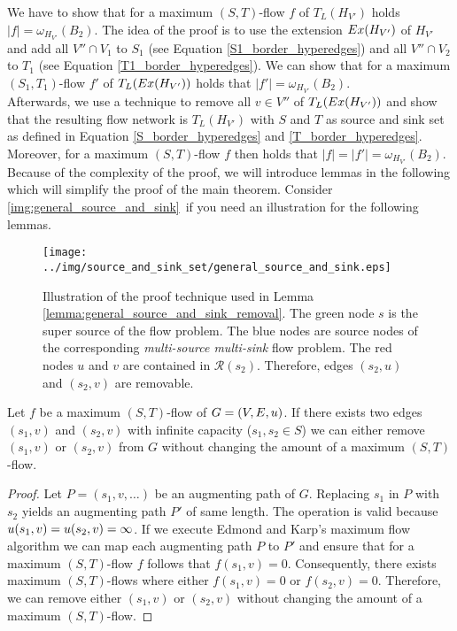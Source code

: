 We have to show that for a maximum $(S,T)$-flow $f$ of $T_L(H_{V'})$ holds $|f| = \omega_{H_{V'}}(B_2)$.
The idea of the proof is to use the extension $Ex(H_{V'})$ of $H_{V'}$ and add 
all $V'' \cap V_1$ to $S_1$ (see Equation \ref{S1_border_hyperedges}) and all $V'' \cap V_2$ to
$T_1$ (see Equation \ref{T1_border_hyperedges}). We can show that for a maximum $(S_1,T_1)$-flow 
$f'$ of $T_L(Ex(H_{V'}))$ holds that $|f'| = \omega_{H_{V'}}(B_2)$.\\
Afterwards, we use a technique to remove all $v \in V''$ of $T_L(Ex(H_{V'}))$ and show
that the resulting flow network is $T_L(H_{V'})$ with $S$ and $T$ as source and sink set as
defined in Equation \ref{S_border_hyperedges} and \ref{T_border_hyperedges}. Moreover, for a maximum
$(S,T)$-flow $f$ then holds that $|f| = |f'| = \omega_{H_{V'}}(B_2)$. \\
Because of the complexity of the proof, we will introduce lemmas in the following which
will simplify the proof of the main theorem. Consider \autoref{img:general_source_and_sink}~if you
need an illustration for the following lemmas.

\begin{figure}
\centering
\texttt{[image: ../img/source\_and\_sink\_set/general\_source\_and\_sink.eps]}
\caption{Illustration of the proof technique used in Lemma \ref{lemma:general_source_and_sink_removal}.
         The green node $s$ is the super source of the flow problem. The blue nodes are source nodes of
         the corresponding \emph{multi-source multi-sink} flow problem. The red nodes $u$ and $v$ are
         contained in $\mathcal{R}(s_2)$. Therefore, edges $(s_2,u)$ and $(s_2,v)$ are removable.}
\label{img:general_source_and_sink}
\end{figure}

\begin{lemma}
\label{lemma:source_edge_removal}
Let $f$ be a maximum $(S,T)$-flow of $G = (V,E,u)$. If there exists two edges $(s_1,v)$ and $(s_2,v)$
with infinite capacity ($s_1,s_2 \in S$) we can either remove $(s_1,v)$ or $(s_2,v)$ from $G$
without changing the amount of a maximum $(S,T)$-flow.
\end{lemma}

\begin{proof}
Let $P = (s_1,v,\ldots)$ be an augmenting path of $G$. Replacing $s_1$ in $P$ with $s_2$ yields
an augmenting path $P'$ of same length. The operation is valid because $u(s_1,v) = u(s_2,v) = \infty$. 
If we execute Edmond and Karp's maximum flow algorithm we can map each augmenting path 
$P$ to $P'$ and ensure that for a maximum $(S,T)$-flow $f$ follows that $f(s_1,v) = 0$. 
Consequently, there exists maximum $(S,T)$-flows where either $f(s_1,v) = 0$ or $f(s_2,v) = 0$.
Therefore, we can remove either $(s_1,v)$ or $(s_2,v)$ without changing the amount of
a maximum $(S,T)$-flow.
\end{proof}

